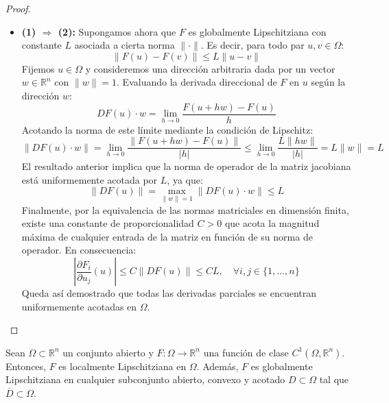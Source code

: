 \begin{proof}
\begin{itemize}
        \item \textbf{(1) $\Rightarrow$ (2):} Supongamos ahora que $F$ es globalmente Lipschitziana con constante $L$ asociada a cierta norma $\|\cdot\|$. Es decir, para todo par $u, v \in \Omega$:
        \[
            \|F(u) - F(v)\| \leq L \|u - v\|
        \]
        Fijemos $u \in \Omega$ y consideremos una dirección arbitraria dada por un vector $w \in \mathbb{R}^n$ con $\|w\| = 1$. Evaluando la derivada direccional de $F$ en $u$ según la dirección $w$:
        \[
            DF(u) \cdot w = \lim_{h \to 0} \frac{F(u + h w) - F(u)}{h}
        \]
        Acotando la norma de este límite mediante la condición de Lipschitz:
        \[
            \| DF(u) \cdot w \| = \lim_{h \to 0} \frac{\|F(u + h w) - F(u)\|}{|h|} \leq \lim_{h \to 0} \frac{L \|h w\|}{|h|} = L \|w\| = L
        \]
        El resultado anterior implica que la norma de operador de la matriz jacobiana está uniformemente acotada por $L$, ya que: 
        \[
            \|DF(u)\| = \max_{\|w\|=1} \|DF(u) \cdot w\| \leq L
        \]
        Finalmente, por la equivalencia de las normas matriciales en dimensión finita, existe una constante de proporcionalidad $C > 0$ que acota la magnitud máxima de cualquier entrada de la matriz en función de su norma de operador. En consecuencia:
        \[
            \left| \frac{\partial F_i}{\partial u_j}(u) \right| \leq C \| DF(u) \| \leq C L, \quad \forall i,j \in \{1, \ldots, n\}
        \]
        Queda así demostrado que todas las derivadas parciales se encuentran uniformemente acotadas en $\Omega$.
    \end{itemize}
\end{proof}

\begin{corolario}
    Sean $\Omega \subset \mathbb{R}^n$ un conjunto abierto y $F : \Omega \to \mathbb{R}^n$ una función de clase $C^1(\Omega, \mathbb{R}^n)$. Entonces, $F$ es localmente Lipschitziana en $\Omega$. 
    Además, $F$ es globalmente Lipschitziana en cualquier subconjunto abierto, convexo y acotado $D \subset \Omega$ tal que $\overline{D} \subset \Omega$.
\end{corolario}

